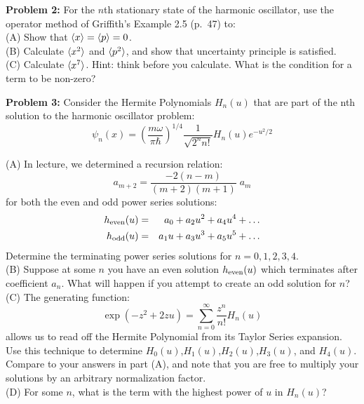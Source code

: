 \documentclass[12pt]{article}
\begin{document}
\vskip 2cm

\noindent
{\bf Problem 2:} For the $n$th stationary state of the harmonic oscillator, use the operator method of Griffith's Example 2.5 (p.~47) to:\\

\noindent
(A) Show that $\braket{x} = \braket{p} = 0$.\\

\noindent  
(B) Calculate $\braket{x^2}$ and $\braket{p^2}$, and show that uncertainty principle is satisfied.\\

\noindent
(C) Calculate $\braket{x^7}$.  Hint:  think before you calculate.  What is the condition for a term to be non-zero?\\


\newpage

\noindent
{\bf Problem 3:} Consider the Hermite Polynomials $H_n(u)$ that are part of the nth solution to the harmonic oscillator problem:
$$\psi_n(x) = \left( \frac{m \omega}{\pi \hbar} \right)^{1/4} \frac{1}{\sqrt{2^n n!}}H_n(u) e^{-u^2/2}$$

\noindent
(A) In lecture, we determined a recursion relation:
$$a_{m+2} = \frac{-2(n-m)}{(m+2)(m+1)} \; a_m$$
for both the even and odd power series solutions:
\begin{eqnarray*}
h_{\rm even}(u)&=&a_0 + a_2 u^2 + a_4 u^4 + \ldots\\
h_{\rm odd}(u)&=&a_1 u + a_3 u^3 + a_5 u^5 + \ldots\\
\end{eqnarray*}
Determine the terminating power series solutions for $n=0,1,2,3,4$.\\

\noindent
(B)  Suppose at some $n$ you have an even solution $h_{\rm even}(u)$ which terminates after coefficient $a_n$.  What will happen if you attempt to create an odd solution for $n$?\\

\noindent
(C) The generating function:
$$\exp(-z^2+2zu) = \sum_{n=0}^{\infty} \frac{z^n}{n!}H_n(u)$$
allows us to read off the Hermite Polynomial from its Taylor Series expansion.  Use this technique to determine $H_0(u)$,$H_1(u)$,$H_2(u)$,$H_3(u)$, and $H_4(u)$. Compare to your answers in part (A), and note that you are free to multiply your solutions by an arbitrary normalization factor.\\

\noindent
(D) For some $n$, what is the term with the highest power of $u$ in $H_n(u)$?\\
\end{document}
